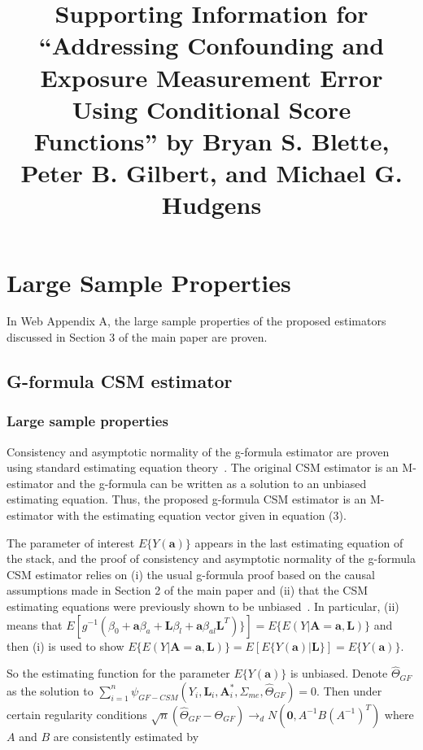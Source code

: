 \documentclass[12pt]{article}
\title{Supporting Information for ``Addressing Confounding and Exposure Measurement Error Using Conditional Score Functions'' by Bryan S. Blette, Peter B. Gilbert, and Michael G. Hudgens}
\date{}
\begin{document}


\maketitle

\section{Large Sample Properties}

In Web Appendix A, the large sample properties of the proposed estimators discussed in Section 3 of the main paper are proven.

\subsection{G-formula CSM estimator}

\subsubsection{Large sample properties}

Consistency and asymptotic normality of the g-formula estimator are proven using standard estimating equation theory~\citep{stefanski2002}. The original CSM estimator is an M-estimator and the g-formula can be written as a solution to an unbiased estimating equation. Thus, the proposed g-formula CSM estimator is an M-estimator with the estimating equation vector given in equation (3).

The parameter of interest $E \{ Y(\bm{a}) \}$ appears in the last estimating equation of the stack, and the proof of consistency and asymptotic normality of the g-formula CSM estimator relies on (i) the usual g-formula proof based on the causal assumptions made in Section 2 of the main paper and (ii) that the CSM estimating equations were previously shown to be unbiased~\citep{carroll2006}. In particular, (ii) means that $E[g^{-1}(\beta_{0} + \bm{a}\beta_{a} + \bm{L}\beta_{l} + \bm{a}\beta_{al}\bm{L}^{T}) \}] = E \{ E(Y | \bm{A} = \bm{a}, \bm{L}) \}$ and then (i) is used to show $E \{ E(Y | \bm{A} = \bm{a}, \bm{L}) \} = E[E \{ Y(\bm{a}) | \bm{L} \}] = E \{ Y(\bm{a}) \}$.

So the estimating function for the parameter $E \{ Y(\bm{a}) \}$ is unbiased. Denote $\hat{\Theta}_{GF}$ as the solution to $\sum_{i=1}^{n} \psi_{GF-CSM}(Y_{i}, \bm{L}_{i}, \bm{A}^{*}_{i}, \Sigma_{me}, \hat{\Theta}_{GF}) = 0$. Then under certain regularity conditions $\sqrt{n}(\hat{\Theta}_{GF} - \Theta_{GF}) \rightarrow_{d} N(\textbf{0}, A^{-1}B(A^{-1})^{T})$ where $A$ and $B$ are consistently estimated by
\end{document}
